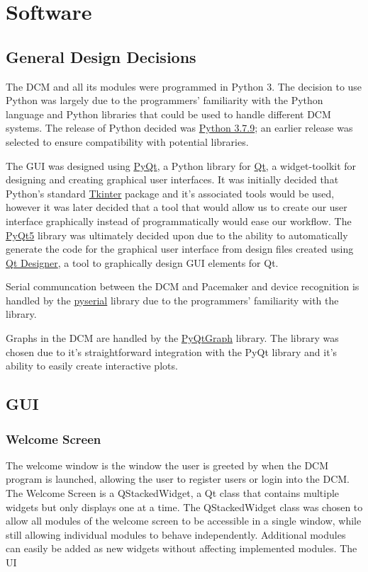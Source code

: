 \documentclass[12pt]{article}
\begin{document}
\newpage
\section{Software}
\subsection{General Design Decisions}
The DCM and all its modules were programmed in Python 3. The decision to use Python was largely due to the programmers' familiarity with the Python language and Python libraries that could be used to handle different DCM systems. The release of Python decided was \href{https://www.python.org/downloads/release/python-379/}{Python 3.7.9}; an earlier release was selected to ensure compatibility with potential libraries.

The GUI was designed using \href{https://riverbankcomputing.com/software/pyqt/intro}{PyQt}, a Python library for \href{https://www.qt.io/}{Qt}, a widget-toolkit for designing and creating graphical user interfaces. It was initially decided that Python's standard \href{https://docs.python.org/3/library/tkinter.html}{Tkinter} package and it's associated tools would be used, however it was later decided that a tool that would allow us to create our user interface graphically instead of programmatically would ease our workflow. The \href{https://pypi.org/project/PyQt5/}{PyQt5} library was ultimately decided upon due to the ability to automatically generate the code for the graphical user interface from design files created using \href{https://doc.qt.io/qt-5/qtdesigner-manual.html}{Qt Designer}, a tool to graphically design GUI elements for Qt.

Serial communcation between the DCM and Pacemaker and device recognition is handled by the \href{https://pypi.org/project/pyserial/}{pyserial} library due to the programmers' familiarity with the library.

Graphs in the DCM are handled by the \href{http://www.pyqtgraph.org/}{PyQtGraph} library. The library was chosen due to it's straightforward integration with the PyQt library and it's ability to easily create interactive plots.

\subsection{GUI}
\subsubsection{Welcome Screen}
The welcome window is the window the user is greeted by when the DCM program is launched, allowing the user to register users or login into the DCM. The Welcome Screen is a QStackedWidget, a Qt class that contains multiple widgets but only displays one at a time. The QStackedWidget class was chosen to allow all modules of the welcome screen to be accessible in a single window, while still allowing individual modules to behave independently. Additional modules can easily be added as new widgets without affecting implemented modules. The UI 
\end{document}
